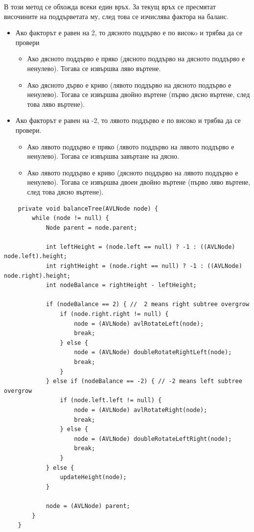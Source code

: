 \documentclass[a4paper,fleqn,12pt]{article}
\begin{document}
В този метод се обхожда всеки един връх. За текущ връх се пресмятат височините на поддърветата му,  след това се изчислява фактора на баланс. 
\begin{itemize}
\item Ако факторът е равен на 2, то дясното поддърво е по високo и трябва да се провери
	\begin{itemize}
	\item Ако дясното поддърво е пряко (дясното поддърво на дясното поддърво е ненулево). Тогава се извършва ляво въртене. 
	\item Ако дясното дърво е криво (лявото поддърво на дясното поддърво е ненулево). Тогава се извършва двойно въртене (първо дясно въртене, след това ляво въртене). 
	\end{itemize}
\item Ако факторът е равен на -2, то лявото поддърво е по високо и трябва да се провери.
	\begin{itemize}
	\item Ако лявото поддърво е пряко (лявото поддърво на лявото поддърво е ненулево). Тогава се извършва завъртане на дясно.
	\item Ако лявото поддърво е криво (дясното поддърво на лявото поддърво е ненулево). Тогава се извършва двоен двойно въртене (първо ляво въртене, след това дясно въртене).
	\end{itemize}
\end{itemize}
\begin{lstlisting}
    private void balanceTree(AVLNode node) {
        while (node != null) {
            Node parent = node.parent;

            int leftHeight = (node.left == null) ? -1 : ((AVLNode) node.left).height;
            int rightHeight = (node.right == null) ? -1 : ((AVLNode) node.right).height;
            int nodeBalance = rightHeight - leftHeight;

            if (nodeBalance == 2) { //  2 means right subtree overgrow
                if (node.right.right != null) {
                    node = (AVLNode) avlRotateLeft(node);
                    break;
                } else {
                    node = (AVLNode) doubleRotateRightLeft(node);
                    break;
                }
            } else if (nodeBalance == -2) { // -2 means left subtree overgrow          
                if (node.left.left != null) {
                    node = (AVLNode) avlRotateRight(node);
                    break;
                } else {
                    node = (AVLNode) doubleRotateLeftRight(node);
                    break;
                }
            } else {
                updateHeight(node);
            }

            node = (AVLNode) parent;
        }
    }
\end{lstlisting}
\end{document}

